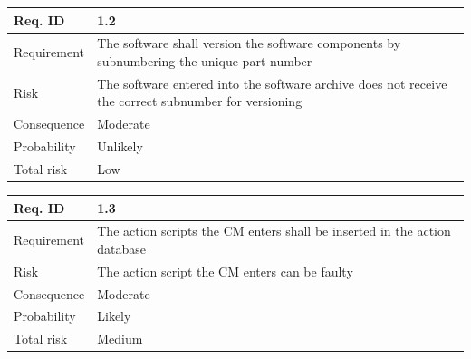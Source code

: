 \begin{table}[H]
\centering
\begin{tabularx}{1.0\textwidth}{
    |p{}%
    |p{}|%
}
\hline
Req. ID
& 1.2
\\
\hline

Requirement
& The software shall version the software components by subnumbering the unique part number
\\
\hline

Risk
& 
The software entered into the software archive does not receive the correct subnumber for versioning
\\
\hline

Consequence
&
Moderate
\\
\hline

Probability
&
Unlikely
\\
\hline

Total risk
&
Low
\\
\hline

\end{tabularx}
\end{table}


\begin{table}[H]
\centering
\begin{tabularx}{1.0\textwidth}{
    |p{}%
    |p{}|%
}
\hline
Req. ID
& 1.3
\\
\hline

Requirement
& The action scripts the CM enters shall be inserted in the action database
\\
\hline

Risk
& 
The action script the CM enters can be faulty
\\
\hline

Consequence
&
Moderate
\\
\hline

Probability
&
Likely
\\
\hline

Total risk
&
Medium
\\
\hline

\end{tabularx}
\end{table}



